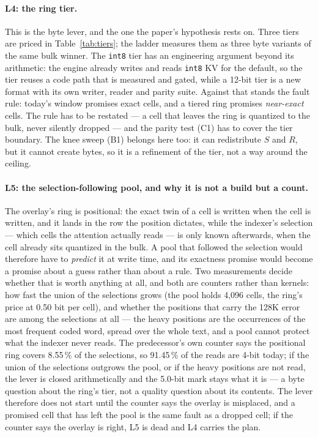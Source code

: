 \documentclass[10pt,twocolumn]{article}
\begin{document}
\paragraph{L4: the ring tier.} This is the byte lever, and the one the paper's hypothesis rests on. Three tiers are priced in Table~\ref{tab:tiers}; the ladder measures them as three byte variants of the same bulk winner. The \texttt{int8} tier has an engineering argument beyond its arithmetic: the engine already writes and reads \texttt{int8} KV for the default, so the tier reuses a code path that is measured and gated, while a 12-bit tier is a new format with its own writer, reader and parity suite. Against that stands the fault rule: today's window promises exact cells, and a tiered ring promises \emph{near-exact} cells. The rule has to be restated --- a cell that leaves the ring is quantized to the bulk, never silently dropped --- and the parity test (C1) has to cover the tier boundary. The knee sweep (B1) belongs here too: it can redistribute $S$ and $R$, but it cannot create bytes, so it is a refinement of the tier, not a way around the ceiling.

\paragraph{L5: the selection-following pool, and why it is not a build but a count.} The overlay's ring is positional: the exact twin of a cell is written when the cell is written, and it lands in the row the position dictates, while the indexer's selection --- which cells the attention actually reads --- is only known afterwards, when the cell already sits quantized in the bulk. A pool that followed the selection would therefore have to \emph{predict} it at write time, and its exactness promise would become a promise about a guess rather than about a rule. Two measurements decide whether that is worth anything at all, and both are counters rather than kernels: how fast the union of the selections grows (the pool holds 4,096 cells, the ring's price at 0.50 bit per cell), and whether the positions that carry the 128K error are among the selections at all --- the heavy positions are the occurrences of the most frequent coded word, spread over the whole text, and a pool cannot protect what the indexer never reads. The predecessor's own counter says the positional ring covers 8.55\,\% of the selections, so 91.45\,\% of the reads are 4-bit today; if the union of the selections outgrows the pool, or if the heavy positions are not read, the lever is closed arithmetically and the 5.0-bit mark stays what it is --- a byte question about the ring's tier, not a quality question about its contents. The lever therefore does not start until the counter says the overlay is misplaced, and a promised cell that has left the pool is the same fault as a dropped cell; if the counter says the overlay is right, L5 is dead and L4 carries the plan.
\end{document}
